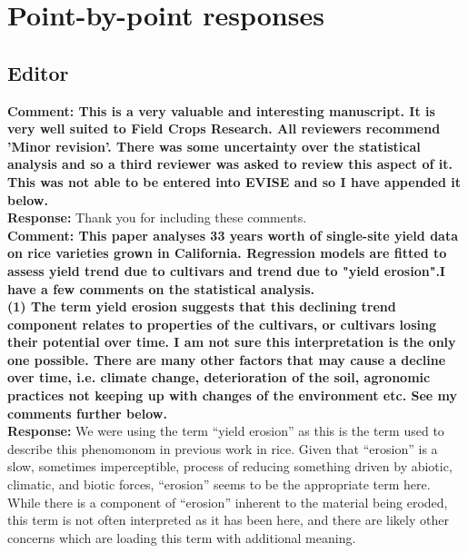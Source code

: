 \documentclass{article} \usepackage[margin=1in]{geometry}
\begin{document}


\newpage

\section{Point-by-point responses}


\subsection{Editor}

\textbf{Comment: This is a very valuable and interesting manuscript.
  It is very well suited to Field Crops Research.  All reviewers
  recommend 'Minor revision'.  There was some uncertainty over the
  statistical analysis and so a third reviewer was asked to review
  this aspect of it. This was not able to be entered into EVISE and so
  I have appended it below.}\\

\textbf{Response:} Thank you for including these comments. \\

\textbf{Comment: This paper analyses 33 years worth of single-site
  yield data on rice varieties grown in California. Regression models
  are fitted to assess yield trend due to cultivars and trend due to
  "yield erosion".I have a few comments on the statistical
  analysis.}\\

\textbf{(1) The term yield erosion suggests that this declining trend
  component relates to properties of the cultivars, or cultivars
  losing their potential over time. I am not sure this interpretation
  is the only one possible. There are many other factors that may
  cause a decline over time, i.e. climate change, deterioration of the
  soil, agronomic practices not keeping up with changes of the
  environment etc. See my comments further below.}\\

\textbf{Response:} We were using the term ``yield erosion'' as this is
the term used to describe this phenomonom in previous work in
rice. Given that ``erosion'' is a slow, sometimes imperceptible,
process of reducing something driven by abiotic, climatic, and biotic
forces, ``erosion'' seems to be the appropriate term here. While there
is a component of ``erosion'' inherent to the material being eroded,
this term is not often interpreted as it has been here, and there are
likely other concerns which are loading this term with additional
meaning.
\end{document}
